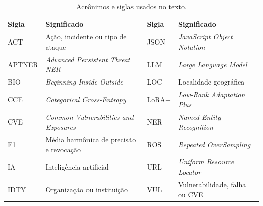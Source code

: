 \begin{table}[ht]
\centering
\caption{Acrônimos e siglas usados no texto.}
\label{tab:acronyms}
\footnotesize
\begin{tabular}{ll|ll}
\hline
\textbf{Sigla} & \textbf{Significado} & \textbf{Sigla} & \textbf{Significado} \\
\hline
ACT & Ação, incidente ou tipo de ataque & JSON & \textit{JavaScript Object Notation} \\
APTNER & \textit{Advanced Persistent Threat NER} & LLM & \textit{Large Language Model} \\
BIO & \textit{Beginning-Inside-Outside} & LOC & Localidade geográfica \\
CCE & \textit{Categorical Cross-Entropy} & LoRA+ & \textit{Low-Rank Adaptation Plus} \\
CVE & \textit{Common Vulnerabilities and Exposures} & NER & \textit{Named Entity Recognition} \\
F1 & Média harmônica de precisão e revocação & ROS & \textit{Repeated OverSampling} \\
IA & Inteligência artificial & URL & \textit{Uniform Resource Locator} \\
IDTY & Organização ou instituição & VUL & Vulnerabilidade, falha ou CVE \\
\hline
\end{tabular}
\end{table}
